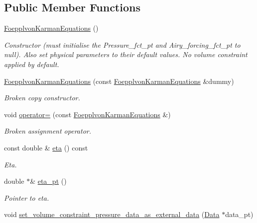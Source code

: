 \subsection*{Public Member Functions}
\begin{DoxyCompactItemize}
\item 
\hyperlink{classoomph_1_1FoepplvonKarmanEquations_a53600b6656096c5674bfb3866ab2e29e}{Foepplvon\+Karman\+Equations} ()
\begin{DoxyCompactList}\small\item\em Constructor (must initialise the Pressure\+\_\+fct\+\_\+pt and Airy\+\_\+forcing\+\_\+fct\+\_\+pt to null). Also set physical parameters to their default values. No volume constraint applied by default. \end{DoxyCompactList}\item 
\hyperlink{classoomph_1_1FoepplvonKarmanEquations_a75ad16a38b782683818999500446dd55}{Foepplvon\+Karman\+Equations} (const \hyperlink{classoomph_1_1FoepplvonKarmanEquations}{Foepplvon\+Karman\+Equations} \&dummy)
\begin{DoxyCompactList}\small\item\em Broken copy constructor. \end{DoxyCompactList}\item 
void \hyperlink{classoomph_1_1FoepplvonKarmanEquations_a99922811dcc40c96e4a06cd0e678b254}{operator=} (const \hyperlink{classoomph_1_1FoepplvonKarmanEquations}{Foepplvon\+Karman\+Equations} \&)
\begin{DoxyCompactList}\small\item\em Broken assignment operator. \end{DoxyCompactList}\item 
const double \& \hyperlink{classoomph_1_1FoepplvonKarmanEquations_ac13007de5218847c3059c0c8971aec75}{eta} () const
\begin{DoxyCompactList}\small\item\em Eta. \end{DoxyCompactList}\item 
double $\ast$\& \hyperlink{classoomph_1_1FoepplvonKarmanEquations_a14eacc9306ffdbd6eff320f2d2b27702}{eta\+\_\+pt} ()
\begin{DoxyCompactList}\small\item\em Pointer to eta. \end{DoxyCompactList}\item 
void \hyperlink{classoomph_1_1FoepplvonKarmanEquations_aefe4ad7be59aeb518f31bc6a7374d957}{set\+\_\+volume\+\_\+constraint\+\_\+pressure\+\_\+data\+\_\+as\+\_\+external\+\_\+data} (\hyperlink{classoomph_1_1Data}{Data} $\ast$data\+\_\+pt)

\end{DoxyCompactItemize}
